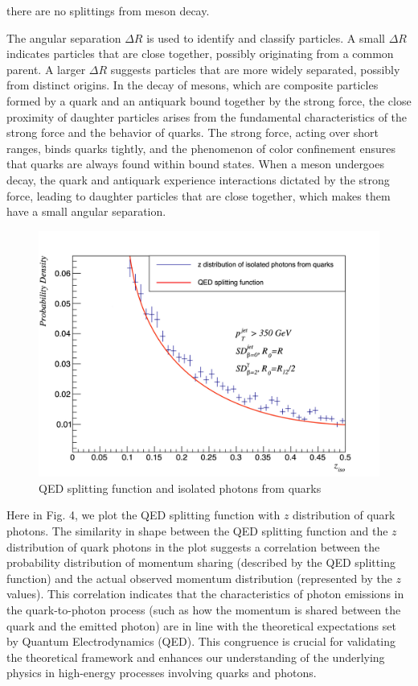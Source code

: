 \documentclass[a4paper, 12pt]{article}
\begin{document}
		there are no splittings from meson decay.\par
		The angular separation $\Delta R$ is used to identify and classify particles. A small $\Delta R$ indicates particles
		that are close together, possibly originating from a common parent. A larger $\Delta R$ suggests particles that are more
		widely separated, possibly from distinct origins. In the decay of mesons, which are composite particles formed by a quark
		and an antiquark bound together by the strong force, the close proximity of daughter particles arises from the fundamental
		characteristics of the strong force and the behavior of quarks. The strong force, acting over short ranges, binds quarks
		tightly, and the phenomenon of color confinement ensures that quarks are always found within bound states. When a meson
		undergoes decay, the quark and antiquark experience interactions dictated by the strong force, leading to daughter particles
		that are close together, which makes them have a small angular separation.\par
		\begin{figure}
			\centering
			\includegraphics[width=\linewidth]{5.pdf}
			\caption{QED splitting function and isolated photons from quarks}
		\end{figure}
		Here in Fig. 4, we plot the QED splitting function with $z$ distribution of quark photons. The similarity in shape between
		the QED splitting function and the $z$ distribution of quark photons in the plot suggests a correlation between the
		probability distribution of momentum sharing (described by the QED splitting function) and the actual observed momentum
		distribution (represented by the $z$ values). This correlation indicates that the characteristics of photon emissions
		in the quark-to-photon process (such as how the momentum is shared between the quark and the emitted photon) are in line
		with the theoretical expectations set by Quantum Electrodynamics (QED). This congruence is crucial for validating the
		theoretical framework and enhances our understanding of the underlying physics in high-energy processes involving quarks
		and photons.
\end{document}
